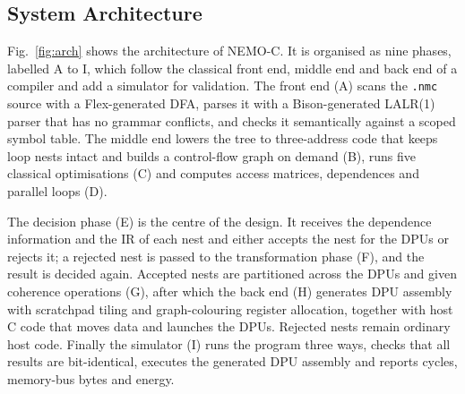 \documentclass{ieeeaccess}
\begin{document}
\subsection{System Architecture}
\label{sec:architecture}

Fig.~\ref{fig:arch} shows the architecture of NEMO-C. It is organised as nine phases, labelled A to I, which follow the classical front end, middle end and back end of a compiler and add a simulator for validation. The front end (A) scans the \texttt{.nmc} source with a Flex-generated DFA, parses it with a Bison-generated LALR(1) parser that has no grammar conflicts, and checks it semantically against a scoped symbol table. The middle end lowers the tree to three-address code that keeps loop nests intact and builds a control-flow graph on demand (B), runs five classical optimisations (C) and computes access matrices, dependences and parallel loops (D).

The decision phase (E) is the centre of the design. It receives the dependence information and the IR of each nest and either accepts the nest for the DPUs or rejects it; a rejected nest is passed to the transformation phase (F), and the result is decided again. Accepted nests are partitioned across the DPUs and given coherence operations (G), after which the back end (H) generates DPU assembly with scratchpad tiling and graph-colouring register allocation, together with host C code that moves data and launches the DPUs. Rejected nests remain ordinary host code. Finally the simulator (I) runs the program three ways, checks that all results are bit-identical, executes the generated DPU assembly and reports cycles, memory-bus bytes and energy.
\end{document}
